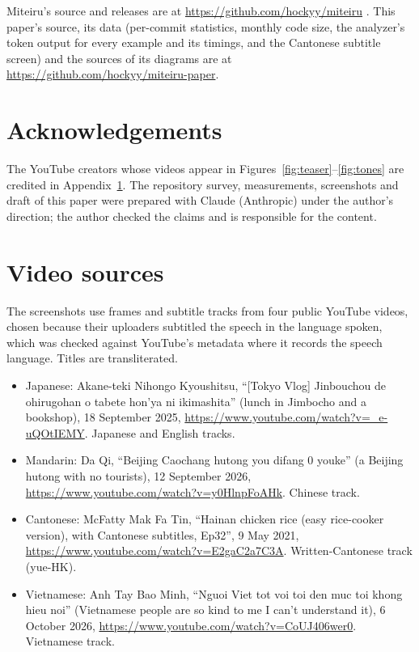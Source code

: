 ﻿\documentclass[11pt,a4paper]{article}
\begin{document}
Miteiru's source and releases are at \url{https://github.com/hockyy/miteiru} \citep{miteiru}. This paper's source, its data (per-commit statistics, monthly code size, the analyzer's token output for every example and its timings, and the Cantonese subtitle screen) and the sources of its diagrams are at \url{https://github.com/hockyy/miteiru-paper}.

\section*{Acknowledgements}
The YouTube creators whose videos appear in Figures~\ref{fig:teaser}--\ref{fig:tones} are credited in Appendix~\ref{app:sources}. The repository survey, measurements, screenshots and draft of this paper were prepared with Claude (Anthropic) under the author's direction; the author checked the claims and is responsible for the content.




\appendix
\section{Video sources}
\label{app:sources}

The screenshots use frames and subtitle tracks from four public YouTube videos, chosen because their uploaders subtitled the speech in the language spoken, which was checked against YouTube's metadata where it records the speech language. Titles are transliterated.
\begin{itemize}
  \item Japanese: Akane-teki Nihongo Kyoushitsu, ``[Tokyo Vlog] Jinbouchou de ohirugohan o tabete hon'ya ni ikimashita'' (lunch in Jimbocho and a bookshop), 18 September 2025, \url{https://www.youtube.com/watch?v=_e-uQOtIEMY}. Japanese and English tracks.
  \item Mandarin: Da Qi, ``Beijing Caochang hutong you difang 0 youke'' (a Beijing hutong with no tourists), 12 September 2026, \url{https://www.youtube.com/watch?v=y0HlnpFoAHk}. Chinese track.
  \item Cantonese: McFatty Mak Fa Tin, ``Hainan chicken rice (easy rice-cooker version), with Cantonese subtitles, Ep32'', 9 May 2021, \url{https://www.youtube.com/watch?v=E2gaC2a7C3A}. Written-Cantonese track (yue-HK).
  \item Vietnamese: Anh Tay Bao Minh, ``Nguoi Viet tot voi toi den muc toi khong hieu noi'' (Vietnamese people are so kind to me I can't understand it), 6 October 2026, \url{https://www.youtube.com/watch?v=CoUJ406wer0}. Vietnamese track.
\end{itemize}
\end{document}
